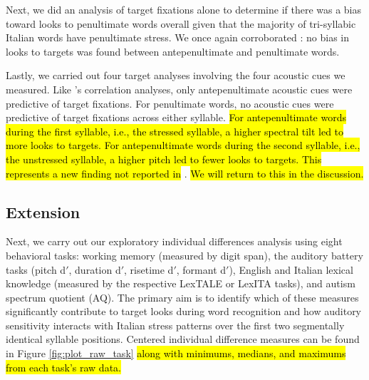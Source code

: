 Next, we did an analysis of target fixations alone to determine if there was a bias toward looks to penultimate words overall given that the majority of tri-syllabic Italian words have penultimate stress. We once again corroborated \cite{Sulpizio_McQueen_2012}: no bias in looks to targets was found between antepenultimate and penultimate words.

Lastly, we carried out four target analyses involving the four acoustic cues we measured. Like \cite{Sulpizio_McQueen_2012}'s correlation analyses, only antepenultimate acoustic cues were predictive of target fixations. For penultimate words, no acoustic cues were predictive of target fixations across either syllable. \hl{For antepenultimate words during the first syllable, i.e., the stressed syllable, a higher spectral tilt led to more looks to targets. For antepenultimate words during the second syllable, i.e., the unstressed syllable, a higher pitch led to fewer looks to targets. This represents a new finding not reported in} \cite{Sulpizio_McQueen_2012}. \hl{We will return to this in the discussion.}

\subsection{Extension}

Next, we carry out our exploratory individual differences analysis using eight behavioral tasks: working memory (measured by digit span), the auditory battery tasks (pitch d$'$, duration d$'$, risetime d$'$, formant d$'$), English and Italian lexical knowledge (measured by the respective LexTALE or LexITA tasks), and autism spectrum quotient (AQ). The primary aim is to identify which of these measures significantly contribute to target looks during word recognition and how auditory sensitivity interacts with Italian stress patterns over the first two segmentally identical syllable positions. Centered individual difference measures can be found in Figure \ref{fig:plot_raw_task} \hl{along with minimums, medians, and maximums from each task's raw data.}

